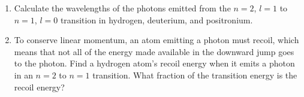 {\begin{enumerate}
\item Calculate the wavelengths of the photons emitted from the  $n=2$, $l=1$ to $n=1$, $l=0$
transition in hydrogen, deuterium, and positronium. 

\item To conserve linear momentum, an atom emitting a photon must
recoil, which means that not all of the energy made available in the
downward jump goes to the photon. Find a hydrogen atom's recoil
energy when it emits a photon in an $n=2$ to $n=1$ transition. What
fraction of the transition energy is the recoil energy? 
\end{enumerate}
}
